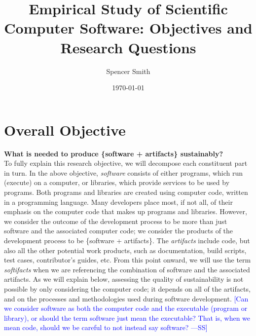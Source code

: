 \documentclass[12pt]{article}
\newcommand{\authornote}[3]{\textcolor{#1}{[#3 ---#2]}}
\newcommand{\authornote}[3]{}
\newcommand{\wss}[1]{\authornote{blue}{SS}{#1}} %
\begin{document}
\title{Empirical Study of Scientific Computer Software: Objectives and Research Questions} 
\author{Spencer Smith}
\date{\today}
	

\section {Overall Objective}

\textbf{What is needed to produce \{software + artifacts\} sustainably?}\\

To fully explain this research objective, we will decompose each constituent
part in turn.  In the above objective, \emph{software} consists of either
programs, which run (execute) on a computer, or libraries, which provide
services to be used by programs.  Both programs and libraries are created using
computer code, written in a programming language.  Many developers place most,
if not all, of their emphasis on the computer code that makes up programs and
libraries.  However, we consider the outcome of the development process to be
more than just software and the associated computer code; we consider the
products of the development process to be \{software + artifacts\}.  The
\emph{artifacts} include code, but also all the other potential work products,
such as documentation, build scripts, test cases, contributor's guides, etc.
From this point onward, we will use the term \emph{softifacts} when we are
referencing the combination of software and the associated artifacts.  As we
will explain below, assessing the quality of sustainability is not possible by
only considering the computer code; it depends on all of the artifacts, and on
the processes and methodologies used during software development.  \wss{Can we
  consider software as both the computer code and the executable (program or
  library), or should the term software just mean the executable?  That is, when
  we mean code, should we be careful to not instead say software?}
\end{document}
